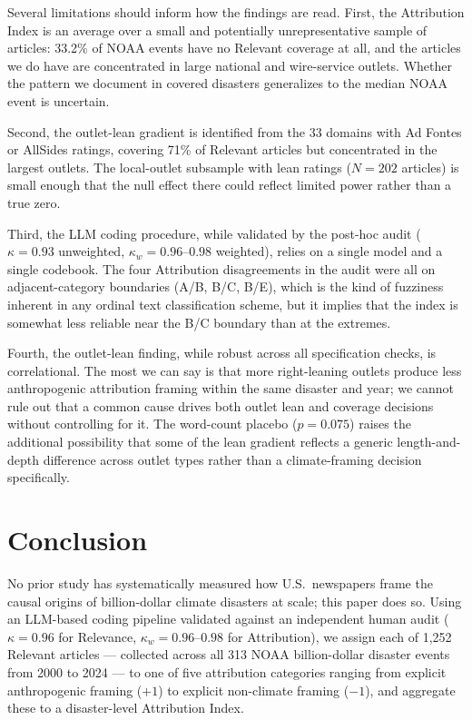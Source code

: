 \documentclass[12pt]{article}
\begin{document}
Several limitations should inform how the findings are read.  First,
the Attribution Index is an average over a small and potentially
unrepresentative sample of articles: 33.2\% of NOAA events have no
Relevant coverage at all, and the articles we do have are concentrated
in large national and wire-service outlets.  Whether the pattern we
document in covered disasters generalizes to the median NOAA event is
uncertain.

Second, the outlet-lean gradient is identified from the 33 domains with
Ad Fontes or AllSides ratings, covering 71\% of Relevant articles but
concentrated in the largest outlets.  The local-outlet subsample with
lean ratings ($N=202$ articles) is small enough that the null effect
there could reflect limited power rather than a true zero.

Third, the LLM coding procedure, while validated by the post-hoc audit
($\kappa = 0.93$ unweighted, $\kappa_w = 0.96$--$0.98$ weighted),
relies on a single model and a single codebook.  The four
Attribution disagreements in the audit were all on adjacent-category
boundaries (A/B, B/C, B/E), which is the kind of fuzziness inherent
in any ordinal text classification scheme, but it implies that the
index is somewhat less reliable near the B/C boundary than at the
extremes.

Fourth, the outlet-lean finding, while robust across all specification
checks, is correlational.  The most we can say is that more
right-leaning outlets produce less anthropogenic attribution framing
within the same disaster and year; we cannot rule out that a common
cause drives both outlet lean and coverage decisions without controlling
for it.  The word-count placebo ($p = 0.075$) raises the additional
possibility that some of the lean gradient reflects a generic
length-and-depth difference across outlet types rather than a
climate-framing decision specifically.


\section{Conclusion}

No prior study has systematically measured how U.S.\ newspapers frame
the causal origins of billion-dollar climate disasters at scale; this
paper does so.  Using an LLM-based coding pipeline validated against an
independent human audit ($\kappa = 0.96$ for Relevance,
$\kappa_w = 0.96$--$0.98$ for Attribution), we assign each of 1,252
Relevant articles --- collected across all 313 NOAA billion-dollar
disaster events from 2000 to 2024 --- to one of five attribution
categories ranging from explicit anthropogenic framing ($+1$) to
explicit non-climate framing ($-1$), and aggregate these to a
disaster-level Attribution Index.
\end{document}
